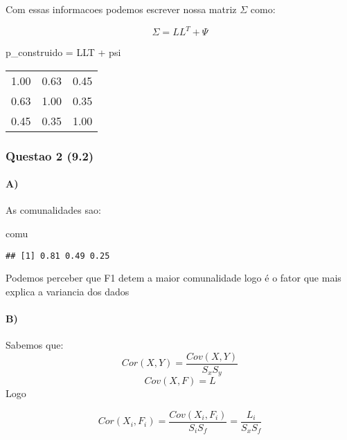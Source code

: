 \documentclass[
]{article}
\newenvironment{Shaded}{\begin{snugshade}}{\end{snugshade}}
\newcommand{\NormalTok}[1]{#1}
\newcommand{\OtherTok}[1]{\textcolor[rgb]{0.56,0.35,0.01}{#1}}
\newcommand{\SpecialCharTok}[1]{\textcolor[rgb]{0.00,0.00,0.00}{#1}}
\begin{document}
Com essas informacoes podemos escrever nossa matriz \(\Sigma\) como:

\[
\Sigma = LL^T + \Psi
\]

\begin{Shaded}
\begin{Highlighting}[]
\NormalTok{p\_construido }\OtherTok{=}\NormalTok{ LLT }\SpecialCharTok{+}\NormalTok{ psi}
\end{Highlighting}
\end{Shaded}

\begin{longtable}[]{@{}rrr@{}}
\toprule()
\endhead
1.00 & 0.63 & 0.45 \\
0.63 & 1.00 & 0.35 \\
0.45 & 0.35 & 1.00 \\
\bottomrule()
\end{longtable}

\hypertarget{questao-2-9.2}{%
\subsubsection{Questao 2 (9.2)}\label{questao-2-9.2}}

\hypertarget{a}{%
\paragraph{A)}\label{a}}

As comunalidades sao:

\begin{Shaded}
\begin{Highlighting}[]
\NormalTok{comu}
\end{Highlighting}
\end{Shaded}

\begin{verbatim}
## [1] 0.81 0.49 0.25
\end{verbatim}

Podemos perceber que F1 detem a maior comunalidade logo é o fator que
mais explica a variancia dos dados

\hypertarget{b}{%
\paragraph{B)}\label{b}}

Sabemos que: \[
Cor(X,Y) = \frac{Cov(X,Y)}{S_xS_y}
\] \[
Cov(X,F) = L
\] Logo

\[
Cor(X_i,F_i) = \frac{Cov(X_i,F_i)}{S_iS_f} = \frac{L_i}{S_xS_f}
\]
\end{document}
